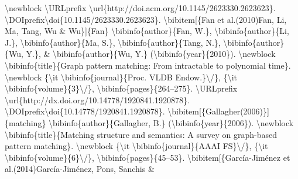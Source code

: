 \documentclass{article}%
\begin{document}
\textbackslash{}newblock \textbackslash{}URLprefix \textbackslash{}url\{http://doi.acm.org/10.1145/2623330.2623623\}.\newline%
\textbackslash{}DOIprefix\textbackslash{}doi\{10.1145/2623330.2623623\}.\newline%
\textbackslash{}bibitem{[}\{Fan et al.(2010)Fan, Li, Ma, Tang, Wu \& Wu\}{]}\{Fan\}\newline%
\textbackslash{}bibinfo\{author\}\{Fan, W.\}, \textbackslash{}bibinfo\{author\}\{Li, J.\}, \textbackslash{}bibinfo\{author\}\{Ma, S.\},\newline%
\textbackslash{}bibinfo\{author\}\{Tang, N.\}, \textbackslash{}bibinfo\{author\}\{Wu, Y.\}, \& \textbackslash{}bibinfo\{author\}\{Wu,\newline%
Y.\} (\textbackslash{}bibinfo\{year\}\{2010\}).\newline%
\textbackslash{}newblock \textbackslash{}bibinfo\{title\}\{Graph pattern matching: From intractable to\newline%
polynomial time\}.\newline%
\textbackslash{}newblock \{\textbackslash{}it \textbackslash{}bibinfo\{journal\}\{Proc. VLDB Endow.\}\textbackslash{}/\}, \{\textbackslash{}it\newline%
\textbackslash{}bibinfo\{volume\}\{3\}\textbackslash{}/\}, \textbackslash{}bibinfo\{pages\}\{264–275\}. \textbackslash{}URLprefix\newline%
\textbackslash{}url\{http://dx.doi.org/10.14778/1920841.1920878\}.\newline%
\textbackslash{}DOIprefix\textbackslash{}doi\{10.14778/1920841.1920878\}.\newline%
\newline%
\textbackslash{}bibitem{[}\{Gallagher(2006)\}{]}\{matching\}\newline%
\textbackslash{}bibinfo\{author\}\{Gallagher, B.\} (\textbackslash{}bibinfo\{year\}\{2006\}).\newline%
\textbackslash{}newblock \textbackslash{}bibinfo\{title\}\{Matching structure and semantics: A survey on\newline%
graph{-}based pattern matching\}.\newline%
\textbackslash{}newblock \{\textbackslash{}it \textbackslash{}bibinfo\{journal\}\{AAAI FS\}\textbackslash{}/\}, \{\textbackslash{}it \textbackslash{}bibinfo\{volume\}\{6\}\textbackslash{}/\},\newline%
\textbackslash{}bibinfo\{pages\}\{45–53\}.\newline%
\textbackslash{}bibitem{[}\{García{-}Jiménez et al.(2014)García{-}Jiménez, Pons, Sanchis \&\newline%
\end{document}

